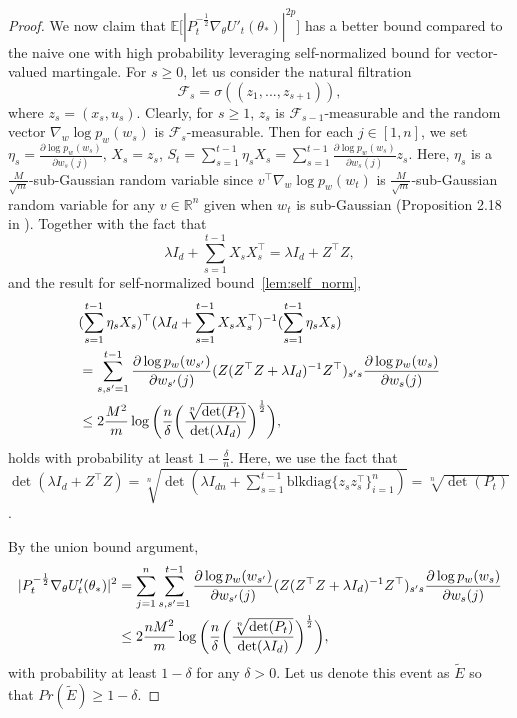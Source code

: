 \documentclass[11pt]{article}
\theoremstyle{plain}
\theoremstyle{definition}
\theoremstyle{remark}
\begin{document}
\begin{proof}
We now claim that $\mathbb{E}\bigg[|P_{t}^{-\frac{1}{2}}\nabla_{\theta} U'_{t}(\theta_*)|^{2p}\bigg]$ has a better bound compared to the naive one with high probability leveraging self-normalized bound for vector-valued martingale. For $s\geq 0$, let us consider the natural filtration 
\[
\mathcal{F}_s = \sigma((z_1,...,z_{s+1})),
\]
where $z_s=(x_s,u_s)$. Clearly, for $s\geq 1$, $z_s$ is $\mathcal{F}_{s-1}$-measurable and the random vector $\nabla_w \log p_w(w_s)$ is $\mathcal{F}_s$-measurable. Then for each $j \in [1,n]$, we set $\eta_s=\frac{\partial\log p_w(w_{s})}{\partial w_{s}(j)}$, $X_s=z_s$, $S_t=\sum_{s=1}^{t-1} \eta_s X_s=\sum_{s=1}^{t-1}\frac{\partial\log p_w(w_{s})}{\partial w_{s}(j)}z_s$. Here, $\eta_s$ is a $\frac{M}{\sqrt{m}}$-sub-Gaussian random variable since $v^\top \nabla_w \log p_w (w_t)$ is $\frac{M}{\sqrt{m}}$-sub-Gaussian random variable for any $v\in\mathbb{R}^n$ given when $w_t$ is sub-Gaussian (Proposition 2.18 in \cite{ledoux2001concentration}). Together with the fact that
\[
\lambda I_d + \sum_{s=1}^{t-1} X_s X_s^\top = \lambda I_d+Z^\top Z,
\]
and the result for self-normalized bound~\ref{lem:self_norm},
\begin{align*}
    &(\sum _{s=1}^{t-1} \eta_s X_s)^\top(\lambda I_d + \sum_{s=1}^{t-1} X_s X_s^\top)^{-1}(\sum _{s=1}^{t-1} \eta_s X_s)\\
    &=\sum_{s,s'=1}^{t-1}\frac{\partial \log p_w(w_{s'})}{\partial w_{s'}(j)}(Z(Z^{\top}Z + \lambda I_d)^{-1}Z^{\top})_{s's}\frac{\partial \log p_w(w_s)}{\partial w_s(j)}\notag\\
    &\leq 2\frac{M^2}{m}\log\bigg(\frac{n}{\delta}\bigg(\frac{\sqrt[n]{\det(P_{t})}}{\det(\lambda I_d)}\bigg)^{\frac{1}{2}}\bigg),
\end{align*}
holds with probability at least $1-\frac{\delta}{n}$.
Here, we use the fact that $\det (\lambda I_d+Z^\top Z) =\sqrt[n]{\det(\lambda I_{dn}+\sum_{s=1}^{t-1} \mathrm{blkdiag}\{z_s z_s^\top\}_{i=1}^n)}  =\sqrt[n]{\det(P_{t})}$.

By the union bound argument,
\begin{align}\label{tight:bd}
    |P_{t}^{-\frac{1}{2}}\nabla_{\theta} U'_{t}(\theta_*)|^{2} &= \sum_{j=1}^n\sum_{s,s'=1}^{t-1}\frac{\partial \log p_w(w_{s'})}{\partial w_{s'}(j)}(Z(Z^{\top}Z + \lambda I_d)^{-1}Z^{\top})_{s's}\frac{\partial \log p_w(w_s)}{\partial w_s(j)}\notag\\ 
    &\leq 2\frac{nM^2}{m}\log\bigg(\frac{n}{\delta}\bigg(\frac{\sqrt[n]{\det(P_{t})}}{\det(\lambda I_d)}\bigg)^{\frac{1}{2}}\bigg),
\end{align}
with probability at least $1- \delta$ for any $\delta>0$. Let us denote this event as $\tilde E$ so that $Pr(\tilde E) \geq 1-\delta$.


\end{proof}
\end{document}
